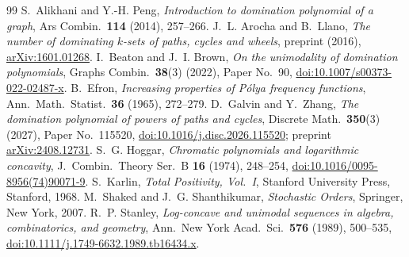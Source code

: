 \documentclass[11pt,a4paper]{amsart}
\theoremstyle{definition}
\theoremstyle{remark}
\begin{document}
\begin{thebibliography}{99}
S.~Alikhani and Y.-H. Peng, \emph{Introduction to domination polynomial of a graph}, Ars Combin.\ \textbf{114} (2014), 257--266.
J.~L. Arocha and B.~Llano, \emph{The number of dominating $k$-sets of paths, cycles and wheels}, preprint (2016), \href{https://arxiv.org/abs/1601.01268}{arXiv:1601.01268}.
I.~Beaton and J.~I. Brown, \emph{On the unimodality of domination polynomials}, Graphs Combin.\ \textbf{38}(3) (2022), Paper No.~90, \href{https://doi.org/10.1007/s00373-022-02487-x}{doi:10.1007/s00373-022-02487-x}.
B.~Efron, \emph{Increasing properties of P\'olya frequency functions}, Ann.\ Math.\ Statist.\ \textbf{36} (1965), 272--279.
D.~Galvin and Y.~Zhang, \emph{The domination polynomial of powers of paths and cycles}, Discrete Math.\ \textbf{350}(3) (2027), Paper No.~115520, \href{https://doi.org/10.1016/j.disc.2026.115520}{doi:10.1016/j.disc.2026.115520}; preprint \href{https://arxiv.org/abs/2408.12731}{arXiv:2408.12731}.
S.~G. Hoggar, \emph{Chromatic polynomials and logarithmic concavity}, J.\ Combin.\ Theory Ser.~B \textbf{16} (1974), 248--254, \href{https://doi.org/10.1016/0095-8956(74)90071-9}{doi:10.1016/0095-8956(74)90071-9}.
S.~Karlin, \emph{Total Positivity, Vol.~I}, Stanford University Press, Stanford, 1968.
M.~Shaked and J.~G. Shanthikumar, \emph{Stochastic Orders}, Springer, New York, 2007.
R.~P. Stanley, \emph{Log-concave and unimodal sequences in algebra, combinatorics, and geometry}, Ann.\ New York Acad.\ Sci.\ \textbf{576} (1989), 500--535, \href{https://doi.org/10.1111/j.1749-6632.1989.tb16434.x}{doi:10.1111/j.1749-6632.1989.tb16434.x}.
\end{thebibliography}
\end{document}
